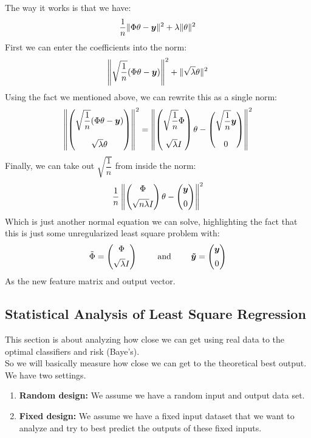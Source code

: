 \documentclass[12pt]{article}
\begin{document}
The way it works is that we have:
\[ \dfrac{1}{n}
\|\Phi \theta - \boldsymbol{y}\|^2 
+ \lambda \|\theta\|^2 \]
First we can enter the coefficients into the norm:
\[ \left\| \sqrt{\dfrac{1}{n}} (\Phi \theta 
- \boldsymbol{y}) \right\|^2
+ \| \sqrt{\lambda} \theta \|^2  \]
Using the fact we mentioned above, we can
rewrite this as a single norm:
\[ \left\| \pmat{\sqrt{\dfrac{1}{n}} 
(\Phi \theta - \bl{y})
\vspace{10pt} \\ \sqrt{\lambda} \theta } \right\|^2
= \left\| \pmat{\sqrt{\dfrac{1}{n}} \Phi
\vspace{10pt} \\ \sqrt{\lambda}I} \theta
- \pmat{\sqrt{\dfrac{1}{n}} \bl{y} 
\vspace{10pt} \\ 0} \right\|^2 \]
Finally, we can take out $\sqrt{\dfrac{1}{n}}$
from inside the norm:
\[ \dfrac{1}{n} \left\| 
\pmat{\Phi \vspace{5pt} \\ \sqrt{n\lambda}I} \theta
- \pmat{\bl{y} \vspace{5pt} \\ 0} \right\|^2 \]
Which is just another normal equation we can solve,
highlighting the fact that this is just
some unregularized least square problem with:
\[ \tilde{\Phi} = 
\pmat{\Phi \vspace{5pt} \\ \sqrt{\lambda}I}
\qquad \AND \qquad 
\bl{\tilde{y}} = 
\pmat{\bl{y} \vspace{5pt} \\ 0} \]
As the new feature matrix and output vector. \\

\newpage

\subsection*{Statistical Analysis of Least Square
Regression}

This section is about analyzing how close we can
get using real data to the optimal classifiers
and risk (Baye's). \\

So we will basically measure how close we
can get to the theoretical best output. \\

We have two settings. \\
\begin{enumerate}
    \item 
    \textbf{Random design:} 
    We assume we have a random
    input and output data set.
    \item 
    \textbf{Fixed design:} 
    We assume we have a fixed input dataset that
    we want to analyze and try to best predict the 
    outputs of these fixed inputs. 
\end{enumerate}
\end{document}
